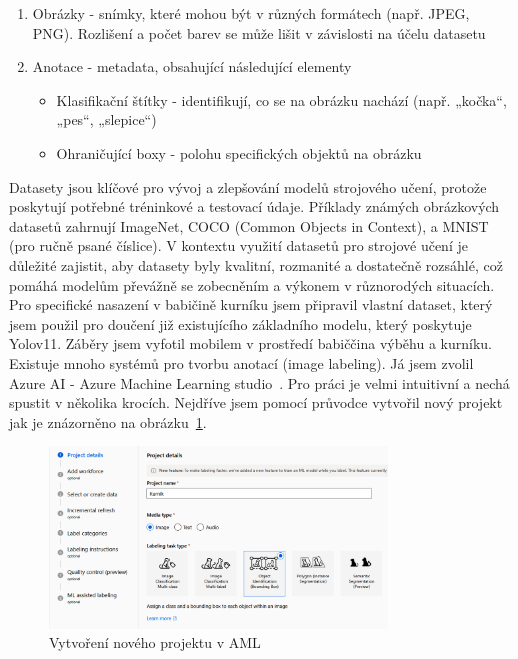 \begin{enumerate}
    \item Obrázky - snímky, které mohou být v různých formátech (např. JPEG, PNG). Rozlišení a počet barev se může lišit v závislosti na účelu datasetu
    \item Anotace - metadata, obsahující následující elementy
    \begin{itemize}
        \item Klasifikační štítky - identifikují, co se na obrázku nachází (např. „kočka“, „pes“, „slepice“)
        \item Ohraničující boxy - polohu specifických objektů na obrázku
    \end{itemize}
\end{enumerate}

Datasety jsou klíčové pro vývoj a zlepšování modelů strojového učení, protože poskytují potřebné tréninkové a testovací údaje.
Příklady známých obrázkových datasetů zahrnují ImageNet, COCO (Common Objects in Context), a MNIST (pro ručně psané číslice).
V kontextu využití datasetů pro strojové učení je důležité zajistit, aby datasety byly kvalitní, rozmanité a dostatečně rozsáhlé, což pomáhá modelům převážně se zobecněním a výkonem v různorodých situacích.
Pro specifické nasazení v babičině kurníku jsem připravil vlastní dataset, který jsem použil pro doučení již existujícího základního modelu, který poskytuje Yolov11.
Záběry jsem vyfotil mobilem v prostředí babiččina výběhu a kurníku.
Existuje mnoho systémů pro tvorbu anotací (image labeling).
Já jsem zvolil Azure AI - Azure Machine Learning studio~\cite{aml}.
Pro práci je velmi intuitivní a nechá spustit v několika krocích.
Nejdříve jsem pomocí průvodce vytvořil nový projekt jak je znázorněno na obrázku~\ref{fig:create_learning_project}.

\begin{figure}[htbp]
    \centering
    \includegraphics[width=0.8\textwidth]{img/create_learning_project}
    \caption{Vytvoření nového projektu v AML}
    \label{fig:create_learning_project}
\end{figure}


